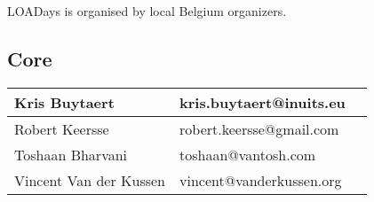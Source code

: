
LOADays is organised by local Belgium organizers.

\subsection{Core}

\begin{longtable}{|p{6cm}|p{6cm}|p{5cm}|}
\hline
Kris Buytaert			&	kris.buytaert@inuits.eu			&		\\
\hline
Robert Keersse			&	robert.keersse@gmail.com		&		\\
\hline
Toshaan Bharvani		&	toshaan@vantosh.com				&		\\
\hline
Vincent Van der Kussen	&	vincent@vanderkussen.org		&		\\
\hline
\end{longtable}
